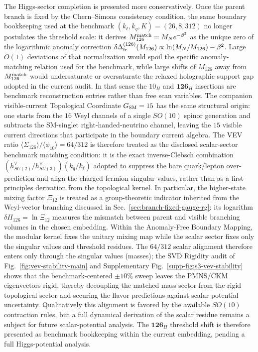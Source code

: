 \documentclass[11pt]{article}
\begin{document}
The Higgs-sector completion is presented more conservatively. Once the parent branch is fixed by the Chern--Simons consistency condition, the same boundary bookkeeping used at the benchmark $(k_{\ell},k_q,K)=(26,8,312)$ no longer postulates the threshold scale: it derives $M_{126}^{\rm match}=M_Ne^{-\beta^2}$ as the unique zero of the logarithmic anomaly correction $\delta\Delta_{\rm fr}^{(126)}(M_{126})\propto\ln(M_N/M_{126})-\beta^2$. Large $O(1)$ deviations of that normalization would spoil the specific anomaly-matching relation used for the benchmark, while large shifts of $M_{126}$ away from $M_{126}^{\rm match}$ would undersaturate or oversaturate the relaxed holographic support gap adopted in the current audit. In that sense the $10_H$ and $\mathbf{126}_H$ insertions are benchmark reconstruction entries rather than free scan variables. The companion visible-current Topological Coordinate $G_{\rm SM}=15$ has the same structural origin: one starts from the $16$ Weyl channels of a single $SO(10)$ spinor generation and subtracts the SM-singlet right-handed-neutrino channel, leaving the $15$ visible current directions that participate in the boundary current algebra. The VEV ratio $\langle\Sigma_{126}\rangle/\langle\phi_{10}\rangle=64/312$ is therefore treated as the disclosed scalar-sector benchmark matching condition: it is the exact inverse-Clebsch combination $(h^{\vee}_{SU(2)}/h^{\vee}_{SU(3)})(k_q/k_{\ell})$ adopted to suppress the bare quark/lepton over-prediction and align the charged-fermion singular values, rather than as a first-principles derivation from the topological kernel. In particular, the higher-state mixing factor $\Xi_{12}$ is treated as a group-theoretic indicator inherited from the Weyl-vector branching discussed in Sec.~\ref{sec:branch-fixed-gauge-rg}: its logarithm $\delta\Pi_{126}=\ln\Xi_{12}$ measures the mismatch between parent and visible branching volumes in the chosen embedding. Within the Anomaly-Free Boundary Mapping, the modular kernel fixes the unitary mixing map while the scalar sector fixes only the singular values and threshold residues. The $64/312$ scalar alignment therefore enters only through the singular values (masses); the SVD Rigidity audit of Fig.~\ref{fig:vev-stability-main} and Supplementary Fig.~\ref{supp-fig:s3-vev-stability} shows that the benchmark-centered $\pm10\%$ sweep leaves the PMNS/CKM eigenvectors rigid, thereby decoupling the matched mass sector from the rigid topological sector and securing the flavor predictions against scalar-potential uncertainty. Qualitatively this alignment is favored by the available $SO(10)$ contraction rules, but a full dynamical derivation of the scalar residue remains a subject for future scalar-potential analysis. The $\mathbf{126}_H$ threshold shift is therefore presented as benchmark bookkeeping within the current embedding, pending a full Higgs-potential analysis.
\end{document}
